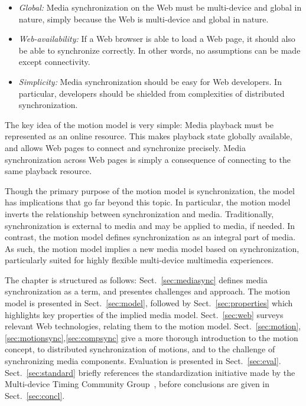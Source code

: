 \begin{itemize}
\item{\emph{Global:} Media synchronization on the Web must be multi-device 
and global in nature, simply because the Web is multi-device and global in nature.}
\item{\emph{Web-availability:} If a Web browser is able to load a Web page, 
it should also be able to synchronize correctly. In other words, no assumptions 
can be made except connectivity.}
\item{\emph{Simplicity:} Media synchronization should be easy for Web developers. 
In particular, developers should be shielded from complexities of distributed synchronization.}
\end{itemize}

The key idea of the motion model is very simple: Media playback must be
represented as an online resource. This makes playback state globally
available, and allows Web pages to connect and synchronize precisely. Media
synchronization across Web pages is simply a consequence of connecting to the
same playback resource.

Though the primary purpose of the motion model is synchronization, the model
has implications that go far beyond this topic. In particular, the motion model
inverts the relationship between synchronization and media. Traditionally,
synchronization is external to media and may be applied to media, if needed.
In contrast, the motion model defines synchronization as an integral part of
media. As such, the motion model implies a new media model based on
synchronization, particularly suited for highly flexible multi-device
multimedia experiences.

The chapter is structured as follows: Sect.~\ref{sec:mediasync} defines media
synchronization as a term, and presentes challenges and approach. The motion
model is presented in Sect.~\ref{sec:model}, followed by
Sect.~\ref{sec:properties} which highlights key properties of the implied
media model. Sect.~\ref{sec:web} surveys relevant Web technologies, relating
them to the motion model.
Sect.~\ref{sec:motion},\ref{sec:motionsync},\ref{sec:compsync} give a more
thorough introduction to the motion concept, to distributed synchronization of
motions, and to the challenge of synchronizing media components. Evaluation is
presented in Sect.~\ref{sec:eval}. Sect.~\ref{sec:standard} briefly references
the standardization initiative made by the Multi-device Timing Community
Group~\cite{mtcg}, before conclusions are given in Sect.~\ref{sec:concl}.
